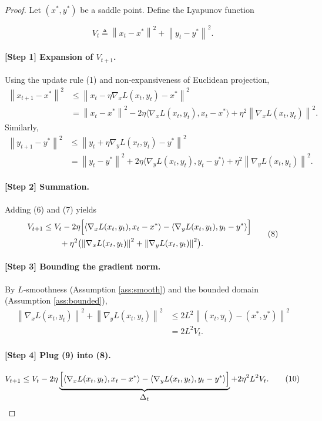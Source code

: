 \documentclass{article}
\newcommand{\norm}[1]{\left\|#1\right\|}
\begin{document}
\begin{proof}
Let $(x^*,y^*)$ be a saddle point. Define the Lyapunov function  

\[
V_t \triangleq \norm{x_t-x^*}^2+\norm{y_t-y^*}^2 .
\tag{5}
\]

\paragraph{[Step 1] Expansion of $V_{t+1}$.}
Using the update rule (1) and non‑expansiveness of Euclidean projection,
\[
\begin{aligned}
\norm{x_{t+1}-x^*}^2 
&\le \norm{x_t-\eta\nabla_x L(x_t,y_t)-x^*}^2\\
&= \norm{x_t-x^*}^2-2\eta\langle\nabla_x L(x_t,y_t),x_t-x^*\rangle
+\eta^2\norm{\nabla_x L(x_t,y_t)}^2 .
\end{aligned}
\tag{6}
\]
Similarly,
\[
\begin{aligned}
\norm{y_{t+1}-y^*}^2 
&\le \norm{y_t+\eta\nabla_y L(x_t,y_t)-y^*}^2\\
&= \norm{y_t-y^*}^2+2\eta\langle\nabla_y L(x_t,y_t),y_t-y^*\rangle
+\eta^2\norm{\nabla_y L(x_t,y_t)}^2 .
\end{aligned}
\tag{7}
\]

\paragraph{[Step 2] Summation.}
Adding (6) and (7) yields
\[
\begin{aligned}
V_{t+1}
&\le V_t
-2\eta\Bigl[\langle\nabla_x L(x_t,y_t),x_t-x^*\rangle
-\langle\nabla_y L(x_t,y_t),y_t-y^*\rangle\Bigr]\\
&\qquad+\eta^2\bigl(\norm{\nabla_x L(x_t,y_t)}^2+\norm{\nabla_y L(x_t,y_t)}^2\bigr).
\end{aligned}
\tag{8}
\]

\paragraph{[Step 3] Bounding the gradient norm.}
By $L$‑smoothness (Assumption \ref{ass:smooth}) and the bounded domain (Assumption \ref{ass:bounded}),
\[
\begin{aligned}
\norm{\nabla_x L(x_t,y_t)}^2+\norm{\nabla_y L(x_t,y_t)}^2
&\le 2L^2 \norm{(x_t,y_t)-(x^*,y^*)}^2\\
&= 2L^2 V_t .
\end{aligned}
\tag{9}
\]

\paragraph{[Step 4] Plug (9) into (8).}
\[
V_{t+1}\le V_t-2\eta\underbrace{\Bigl[\langle\nabla_x L(x_t,y_t),x_t-x^*\rangle
-\langle\nabla_y L(x_t,y_t),y_t-y^*\rangle\Bigr]}_{\displaystyle \Delta_t}
+2\eta^2L^2 V_t .
\tag{10}
\]


\end{proof}
\end{document}
